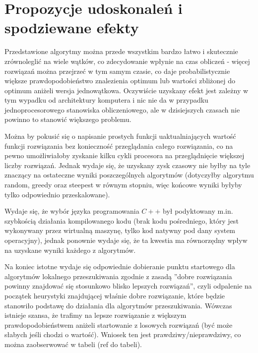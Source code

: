 \section{Propozycje udoskonaleń i spodziewane efekty}
Przedstawione algorytmy można przede wszystkim bardzo łatwo i skutecznie zrównoleglić na wiele wątków, co zdecydowanie wpłynie na czas obliczeń - więcej rozwiązań można przejrzeć w tym samym czasie, co daje probabilistycznie większe prawdopodobieństwo znalezienia optimum lub wartości zbliżonej do optimum aniżeli wersja jednowątkowa. Oczywiście uzyskany efekt jest zależny w tym wypadku od architektury komputera i nic nie da w przypadku jednoprocesorowego stanowiska obliczeniowego, ale w dzisiejszych czasach nie powinno to stanowić większego problemu.

Można by pokusić się o napisanie prostych funkcji uaktualniających wartość funkcji rozwiązania bez konieczność przeglądania całego rozwiązania, co na pewno umożliwiałoby zyskanie kilku cykli procesora na przeglądnięcie większej liczby rozwiązań. Jednak wydaje się, że uzyskany zysk czasowy nie byłby na tyle znaczący na ostateczne wyniki poszczególnych algorytmów (dotyczyłby algorytmu random, greedy oraz steepest w równym stopniu, więc końcowe wyniki byłyby tylko odpowiednio przeskalowane).

Wydaje się, że wybór języka programowania $C++$ był podyktowany m.in. szybkością działania kompilowanego kodu (brak kodu pośredniego, który jest wykonywany przez wirtualną maszynę, tylko kod natywny pod dany system operacyjny), jednak ponownie wydaje się, że ta kwestia ma równorzędny wpływ na uzyskane wyniki każdego z algorytmów.

Na koniec istotne wydaje się odpowiednie dobieranie punktu startowego dla algorytmów lokalnego przeszukiwania zgodnie z zasadą ''dobre rozwiązania powinny znajdować się stosunkowo blisko lepszych rozwiązań'', czyli odpalenie na początek heurystyki znajdującej właśnie dobre rozwiązanie, które będzie stanowiło podstawę do działania dla algorytmów przeszukiwania. Wówczas istnieje szansa, że trafimy na lepsze rozwiązanie z większym prawdopodobieństwem aniżeli startowanie z losowych rozwiązań (być może słabych jeśli chodzi o wartość). Wniosek ten jest prawdziwy/nieprawdziwy, co można zaobserwować w tabeli (ref do tabeli).